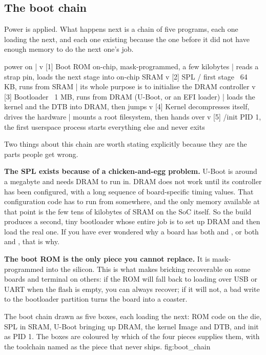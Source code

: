 \subsection{The boot chain}
\label{c1:app:a2}

Power is applied. What happens next is a chain of five programs, each one loading the next, and each
one existing because the one before it did not have enough memory to do the next one's job.

\begin{console}
  power on
     |
     v
  [1] Boot ROM          on-chip, mask-programmed, a few kilobytes
     |                  reads a strap pin, loads the next stage into on-chip SRAM
     v
  [2] SPL / first stage  ~64 KB, runs from SRAM
     |                  its whole purpose is to initialise the DRAM controller
     v
  [3] Bootloader         ~1 MB, runs from DRAM (U-Boot, or an EFI loader)
     |                  loads the kernel and the DTB into DRAM, then jumps
     v
  [4] Kernel             decompresses itself, drives the hardware
     |                  mounts a root filesystem, then hands over
     v
  [5] /init              PID 1, the first userspace process
                        starts everything else and never exits
\end{console}

\noindent Two things about this chain are worth stating explicitly because they are the parts people
get wrong.

\textbf{The SPL exists because of a chicken-and-egg problem.} U-Boot is around a megabyte and needs
DRAM to run in. DRAM does not work until its controller has been configured, with a long sequence of
board-specific timing values. That configuration code has to run from somewhere, and the only memory
available at that point is the few tens of kilobytes of SRAM on the SoC itself. So the build
produces a second, tiny bootloader whose entire job is to set up DRAM and then load the real one. If
you have ever wondered why a board has both  and , or both  and
, that is why.

\textbf{The boot ROM is the only piece you cannot replace.} It is mask-programmed into the silicon.
This is what makes bricking recoverable on some boards and terminal on others: if the ROM will fall
back to loading over USB or UART when the flash is empty, you can always recover; if it will not, a
bad write to the bootloader partition turns the board into a coaster.

  {The boot chain drawn as five boxes, each loading the next: ROM code on the die, SPL in SRAM, U-Boot
   bringing up DRAM, the kernel Image and DTB, and init as PID 1. The boxes are coloured by which of
   the four pieces supplies them, with the toolchain named as the piece that never ships.}
  {fig:boot_chain}

